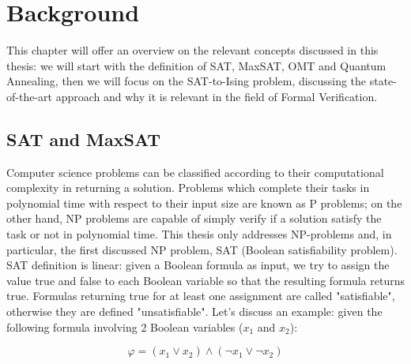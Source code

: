 \chapter{Background}
\label{cha:introQA}

This chapter will offer an overview on the relevant concepts discussed in this thesis: we will start with the definition of SAT, MaxSAT, OMT and Quantum Annealing, then we will focus on the SAT-to-Ising problem, discussing the state-of-the-art approach and why it is relevant in the field of Formal Verification.

\section{SAT and MaxSAT}
\label{sec:satmaxsat}

Computer science problems can be classified according to their computational complexity in returning a solution. Problems which complete their tasks in polynomial time with respect to their input size are known as P problems; on the other hand, NP problems are capable of simply verify if a solution satisfy the task or not in polynomial time. This thesis only addresses NP-problems and, in particular, the first discussed NP problem, SAT (Boolean satisfiability problem). \\
SAT definition is linear: given a Boolean formula as input, we try to assign the value true and false to each Boolean variable so that the resulting formula returns true. Formulas returning true for at least one assignment are called "satisfiable", otherwise they are defined "unsatisfiable". Let's discuss an example: given the following formula involving 2 Boolean variables ($x_1$ and $x_2$):

\begin{equation}
    \varphi = ( x_1 \vee x_2) \wedge (\neg x_1 \vee \neg x_2)
\end{equation}

